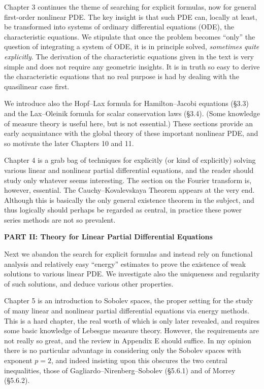 Chapter 3 continues the theme of searching for explicit formulas, now for general first-order nonlinear PDE. The key insight is that such PDE can, locally at least, be transformed into systems of ordinary differential equations (ODE), the characteristic equations. We stipulate that once the problem becomes ``only'' the question of integrating a system of ODE, it is in principle solved, \textit{sometimes quite explicitly}. The derivation of the characteristic equations given in the text is very simple and does not require any geometric insights. It is in truth so easy to derive the characteristic equations that no real purpose is had by dealing with the quasilinear case first.

We introduce also the Hopf--Lax formula for Hamilton--Jacobi equations (\S 3.3) and the Lax--Oleinik formula for scalar conservation laws (\S 3.4). (Some knowledge of measure theory is useful here, but is not essential.) These sections provide an early acquaintance with the global theory of these important nonlinear PDE, and so motivate the later Chapters 10 and 11.

Chapter 4 is a grab bag of techniques for explicitly (or kind of explicitly) solving various linear and nonlinear partial differential equations, and the reader should study only whatever seems interesting. The section on the Fourier transform is, however, essential. The Cauchy--Kovalevskaya Theorem appears at the very end. Although this is basically the only general existence theorem in the subject, and thus logically should perhaps be regarded as central, in practice these power series methods are not so prevalent.

\textbf{PART II: Theory for Linear Partial Differential Equations}

Next we abandon the search for explicit formulas and instead rely on functional analysis and relatively easy ``energy'' estimates to prove the existence of weak solutions to various linear PDE. We investigate also the uniqueness and regularity of such solutions, and deduce various other properties.

Chapter 5 is an introduction to Sobolev spaces, the proper setting for the study of many linear and nonlinear partial differential equations via energy methods. This is a hard chapter, the real worth of which is only later revealed, and requires some basic knowledge of Lebesgue measure theory. However, the requirements are not really so great, and the review in Appendix E should suffice. In my opinion there is no particular advantage in considering only the Sobolev spaces with exponent $p = 2$, and indeed insisting upon this obscures the two central inequalities, those of Gagliardo--Nirenberg--Sobolev (\S 5.6.1) and of Morrey (\S 5.6.2).

